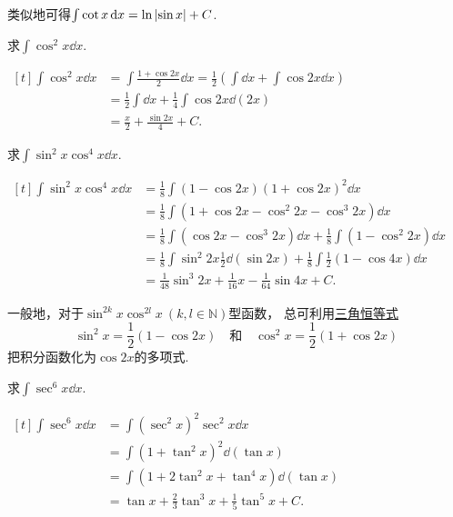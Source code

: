 类似地可得\(\int \cot x \dd{x} = \ln\abs{\sin x} + C\).

\begin{example}
求\(\int \cos^2 x \dd{x}\).
\begin{solution}
\(\begin{aligned}[t]
	\int \cos^2 x \dd{x}
	&= \int \frac{1 + \cos 2x}{2} \dd{x}
	= \frac{1}{2} \left( \int \dd{x} + \int \cos 2x \dd{x} \right) \\
	&= \frac{1}{2} \int \dd{x} + \frac{1}{4} \int \cos 2x \dd(2x) \\
	&= \frac{x}{2} + \frac{\sin 2x}{4} + C.
\end{aligned}\)
\end{solution}
\end{example}

\begin{example}
求\(\int \sin^2 x \cos^4 x \dd{x}\).
\begin{solution}
\(\begin{aligned}[t]
	\int \sin^2 x \cos^4 x \dd{x}
	&= \frac{1}{8} \int (1 - \cos 2x) (1 + \cos 2x)^2 \dd{x} \\
	&= \frac{1}{8} \int (1 + \cos 2x - \cos^2 2x - \cos^3 2x) \dd{x} \\
	&= \frac{1}{8} \int (\cos 2x - \cos^3 2x) \dd{x}
		+ \frac{1}{8} \int (1 - \cos^2 2x) \dd{x} \\
	&= \frac{1}{8} \int \sin^2 2x \frac{1}{2} \dd(\sin 2x)
		+ \frac{1}{8} \int \frac{1}{2} (1 - \cos 4x) \dd{x} \\
	&= \frac{1}{48} \sin^3 2x + \frac{1}{16} x - \frac{1}{64} \sin 4x + C.
\end{aligned}\)
\end{solution}
\end{example}

\begin{remark}
一般地，对于\(\sin^{2k} x \cos^{2l} x\ (k,l\in\mathbb{N})\)型函数，
总可利用\hyperref[equation:三角函数.余弦的二倍角公式1]{三角恒等式}\begin{equation*}
	\sin^2 x = \frac{1}{2} (1 - \cos 2x)
	\quad\text{和}\quad
	\cos^2 x = \frac{1}{2} (1 + \cos 2x)
\end{equation*}把积分函数化为\(\cos 2x\)的多项式.
\end{remark}

\begin{example}
求\(\int \sec^6x \dd{x}\).
\begin{solution}
\(\begin{aligned}[t]
	\int \sec^6x \dd{x}
	&= \int (\sec^2x)^2 \sec^2x \dd{x} \\
	&= \int (1+\tan^2x)^2 \dd(\tan x) \\
	&= \int (1+2\tan^2x+\tan^4x) \dd(\tan x) \\
	&= \tan x + \frac23 \tan^3x + \frac15 \tan^5x + C.
\end{aligned}\)
\end{solution}
\end{example}

